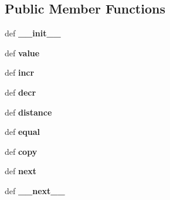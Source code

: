 \subsection*{Public Member Functions}
\begin{DoxyCompactItemize}
\item 
\hypertarget{classgauss_1_1_swig_py_iterator_a47cdaa3c987857086a9dd4fc44dfa79a}{def {\bfseries \-\_\-\-\_\-init\-\_\-\-\_\-}}\label{classgauss_1_1_swig_py_iterator_a47cdaa3c987857086a9dd4fc44dfa79a}

\item 
\hypertarget{classgauss_1_1_swig_py_iterator_ab8a37a9e6859931168a4ac2b4748bab2}{def {\bfseries value}}\label{classgauss_1_1_swig_py_iterator_ab8a37a9e6859931168a4ac2b4748bab2}

\item 
\hypertarget{classgauss_1_1_swig_py_iterator_a7ec9bb3b4d0881305de7620cc63f6178}{def {\bfseries incr}}\label{classgauss_1_1_swig_py_iterator_a7ec9bb3b4d0881305de7620cc63f6178}

\item 
\hypertarget{classgauss_1_1_swig_py_iterator_a2218f2e931566497a9f7a2ccc7587ebd}{def {\bfseries decr}}\label{classgauss_1_1_swig_py_iterator_a2218f2e931566497a9f7a2ccc7587ebd}

\item 
\hypertarget{classgauss_1_1_swig_py_iterator_a8de0778e3afcf76169cad3ad2a37919a}{def {\bfseries distance}}\label{classgauss_1_1_swig_py_iterator_a8de0778e3afcf76169cad3ad2a37919a}

\item 
\hypertarget{classgauss_1_1_swig_py_iterator_a729f6715b8f0e4b7083438ec5cbfc5cf}{def {\bfseries equal}}\label{classgauss_1_1_swig_py_iterator_a729f6715b8f0e4b7083438ec5cbfc5cf}

\item 
\hypertarget{classgauss_1_1_swig_py_iterator_a91f857819e05eeb0441cb3620083724e}{def {\bfseries copy}}\label{classgauss_1_1_swig_py_iterator_a91f857819e05eeb0441cb3620083724e}

\item 
\hypertarget{classgauss_1_1_swig_py_iterator_abdad1d64c5c8683ea3e03d3c6e550d13}{def {\bfseries next}}\label{classgauss_1_1_swig_py_iterator_abdad1d64c5c8683ea3e03d3c6e550d13}

\item 
\hypertarget{classgauss_1_1_swig_py_iterator_a4f43b9064ad19c30c57c28a120ac983f}{def {\bfseries \-\_\-\-\_\-next\-\_\-\-\_\-}}\label{classgauss_1_1_swig_py_iterator_a4f43b9064ad19c30c57c28a120ac983f}


\end{DoxyCompactItemize}
